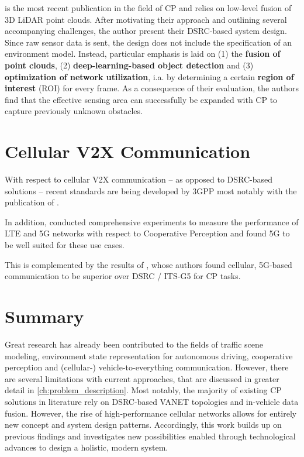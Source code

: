 \cite{Chen2019} is the most recent publication in the field of CP and relies on low-level fusion of 3D LiDAR point clouds. After motivating their approach and outlining several accompanying challenges, the author present their DSRC-based system design. Since raw sensor data is sent, the design does not include the specification of an environment model. Instead, particular emphasis is laid on (1) the \textbf{fusion of point clouds}, (2)\textbf{ deep-learning-based object detection} and (3) \textbf{optimization of network utilization}, i.a. by determining a certain \textbf{region of interest} (ROI) for every frame. As a consequence of their evaluation, the authors find that the effective sensing area can successfully be expanded with CP to capture previously unknown obstacles. 

\section{Cellular V2X Communication}
\label{sec:related_work:cellular_v2x_communication}
With respect to cellular V2X communication – as opposed to DSRC-based solutions – recent standards are being developed by 3GPP most notably with the publication of \cite{3GPP2019}.

In addition, \cite{QualcommTechnologiesInc.2018} conducted comprehensive experiments to measure the performance of LTE and 5G networks with respect to Cooperative Perception and found 5G to be well suited for these use cases. 

This is complemented by the results of \cite{5GAutomotiveAssociation2016}, whose authors found cellular, 5G-based communication to be superior over DSRC / ITS-G5 for CP tasks.

\section{Summary}
\label{sec:related_work:summary}
Great research has already been contributed to the fields of traffic scene modeling, environment state representation for autonomous driving, cooperative perception and (cellular-) vehicle-to-everything communication. However, there are several limitations with current approaches, that are discussed in greater detail in \autoref{ch:problem_description}. Most notably, the majority of existing CP solutions in literature rely on DSRC-based VANET topologies and in-vehicle data fusion. However, the rise of high-performance cellular networks allows for entirely new concept and system design patterns. Accordingly, this work builds up on previous findings and investigates new possibilities enabled through technological advances to design a holistic, modern system. 